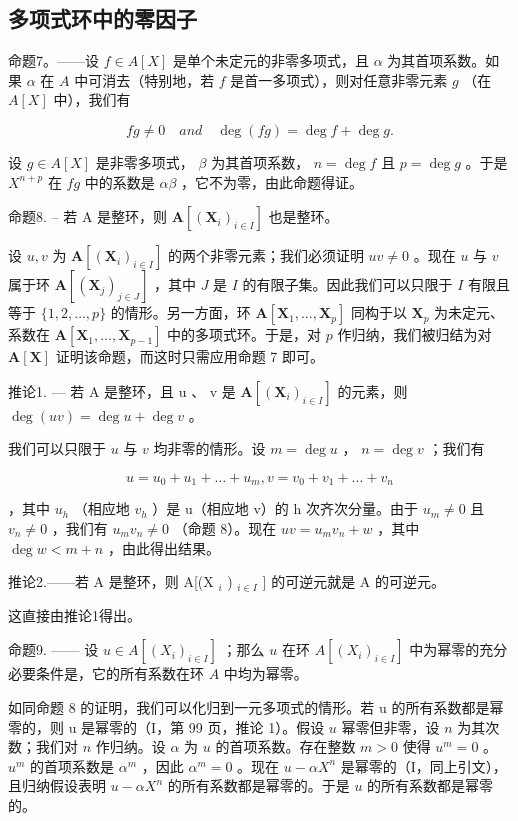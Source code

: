 \subsection{多项式环中的零因子}

命题7。——设 \(f \in A[X]\) 是单个未定元的非零多项式，且 \(\alpha\) 为其首项系数。如果 \(\alpha\) 在 \(A\) 中可消去（特别地，若 \(f\) 是首一多项式），则对任意非零元素 \(g\) （在 \(A[X]\) 中），我们有

\[
f g \neq 0 \quad a n d \quad \deg (f g) = \deg f + \deg g.
\]

设 \(g \in A[X]\) 是非零多项式， \(\beta\) 为其首项系数， \(n = \deg f\) 且 \(p = \deg g\) 。于是 \(X^{n+p}\) 在 \(fg\) 中的系数是 \(\alpha\beta\) ，它不为零，由此命题得证。

命题8. -- 若 A 是整环，则 \(\mathbf{A}[(\mathbf{X}_i)_{i\in I}]\) 也是整环。

设 \(u, v\) 为 \(\mathbf{A}[(\mathbf{X}_i)_{i \in I}]\) 的两个非零元素；我们必须证明 \(uv \neq 0\) 。现在 \(u\) 与 \(v\) 属于环 \(\mathbf{A}[(\mathbf{X}_j)_{j \in J}]\) ，其中 \(J\) 是 \(I\) 的有限子集。因此我们可以只限于 \(I\) 有限且等于 \(\{1, 2, \ldots, p\}\) 的情形。另一方面，环 \(\mathbf{A}[\mathbf{X}_1, \ldots, \mathbf{X}_p]\) 同构于以 \(\mathbf{X}_p\) 为未定元、系数在 \(\mathbf{A}[\mathbf{X}_1, \ldots, \mathbf{X}_{p-1}]\) 中的多项式环。于是，对 \(p\) 作归纳，我们被归结为对 \(\mathbf{A}[\mathbf{X}]\) 证明该命题，而这时只需应用命题 7 即可。

推论1. --- 若 A 是整环，且 u 、 v 是 \(\mathbf{A}[(\mathbf{X}_{i})_{i\in I}]\) 的元素，则 \(\deg(uv)=\deg u+\deg v\) 。

我们可以只限于 \(u\) 与 \(v\) 均非零的情形。设 \(m = \deg u\) ， \(n = \deg v\) ；我们有

\[
u = u _ {0} + u _ {1} + \dots + u _ {m}, v = v _ {0} + v _ {1} + \dots + v _ {n}
\]

，其中 \(u_{h}\) （相应地 \(v_{h}\) ）是 u（相应地 v）的 h 次齐次分量。由于 \(u_{m} \neq 0\) 且 \(v_{n} \neq 0\) ，我们有 \(u_{m}v_{n} \neq 0\) （命题 8）。现在 \(uv = u_{m}v_{n} + w\) ，其中 \(\deg w < m + n\) ，由此得出结果。

推论2.——若 A 是整环，则 A{[}(X \(_{i}\) ) \(_{i \in I}\) {]} 的可逆元就是 A 的可逆元。

这直接由推论1得出。

命题9. —— 设 \(u \in A[(X_i)_{i \in I}]\) ；那么 \(u\) 在环 \(A[(X_i)_{i \in I}]\) 中为幂零的充分必要条件是，它的所有系数在环 \(A\) 中均为幂零。

如同命题 8 的证明，我们可以化归到一元多项式的情形。若 u 的所有系数都是幂零的，则 u 是幂零的（I，第 99 页，推论 1）。假设 \(u\) 幂零但非零，设 \(n\) 为其次数；我们对 \(n\) 作归纳。设 \(\alpha\) 为 \(u\) 的首项系数。存在整数 \(m > 0\) 使得 \(u^m = 0\) 。 \(u^m\) 的首项系数是 \(\alpha^m\) ，因此 \(\alpha^m = 0\) 。现在 \(u - \alpha X^n\) 是幂零的（I，同上引文），且归纳假设表明 \(u - \alpha X^n\) 的所有系数都是幂零的。于是 \(u\) 的所有系数都是幂零的。

